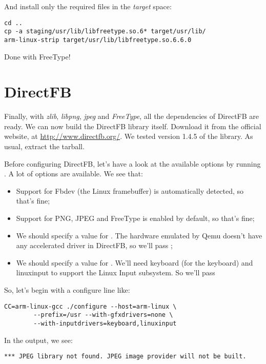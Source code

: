 And install only the required files in the {\em target} space:

\begin{verbatim}
cd ..
cp -a staging/usr/lib/libfreetype.so.6* target/usr/lib/
arm-linux-strip target/usr/lib/libfreetype.so.6.6.0
\end{verbatim}

Done with FreeType!

\section{DirectFB}

Finally, with {\em zlib}, {\em libpng}, {\em jpeg} and {\em FreeType},
all the dependencies of DirectFB are ready. We can now build the
DirectFB library itself. Download it from the official website, at
\url{http://www.directfb.org/}. We tested version 1.4.5 of the
library. As usual, extract the tarball.

Before configuring DirectFB, let's have a look at the available
options by running . A lot of options are
available. We see that:

\begin{itemize}
\item Support for Fbdev (the Linux framebuffer) is automatically
  detected, so that's fine;
\item Support for PNG, JPEG and FreeType is enabled by default, so
  that's fine;
\item We should specify a value for . The
  hardware emulated by Qemu doesn't have any accelerated driver in
  DirectFB, so we'll pass ;
\item We should specify a value for . We'll
  need keyboard (for the keyboard) and linuxinput to support the Linux
  Input subsystem. So we'll pass
\end{itemize}

So, let's begin with a configure line like:

\begin{verbatim}
CC=arm-linux-gcc ./configure --host=arm-linux \
        --prefix=/usr --with-gfxdrivers=none \
        --with-inputdrivers=keyboard,linuxinput
\end{verbatim}

In the output, we see:

\begin{verbatim}
*** JPEG library not found. JPEG image provider will not be built.
\end{verbatim}

